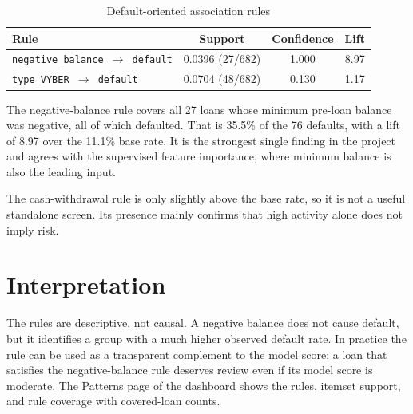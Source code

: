 \begin{table}[H]
    \centering
    \small
    \renewcommand{\arraystretch}{1.25}
    \begin{tabular}{|l|c|c|c|}
        \hline
        \textbf{Rule} & \textbf{Support} & \textbf{Confidence} & \textbf{Lift} \\
        \hline
        \texttt{negative\_balance $\rightarrow$ default} & 0.0396 (27/682) & 1.000 & 8.97 \\
        \texttt{type\_VYBER $\rightarrow$ default} & 0.0704 (48/682) & 0.130 & 1.17 \\
        \hline
    \end{tabular}
    \caption{Default-oriented association rules}
    \label{tab:rules}
\end{table}

The negative-balance rule covers all 27 loans whose minimum pre-loan balance was negative, all of which defaulted. That is 35.5\% of the 76 defaults, with a lift of 8.97 over the 11.1\% base rate. It is the strongest single finding in the project and agrees with the supervised feature importance, where minimum balance is also the leading input.

The cash-withdrawal rule is only slightly above the base rate, so it is not a useful standalone screen. Its presence mainly confirms that high activity alone does not imply risk.

\section{Interpretation}
The rules are descriptive, not causal. A negative balance does not cause default, but it identifies a group with a much higher observed default rate. In practice the rule can be used as a transparent complement to the model score: a loan that satisfies the negative-balance rule deserves review even if its model score is moderate. The Patterns page of the dashboard shows the rules, itemset support, and rule coverage with covered-loan counts.
